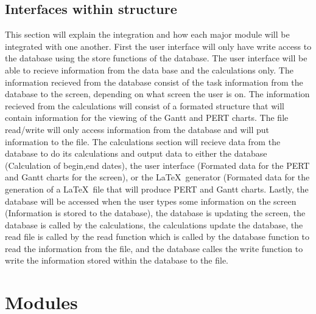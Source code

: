         \subsection{Interfaces within structure}
   This section will explain the integration and how each major module will
be integrated with one another. First the user interface will only have
write access to the database using the store functions of the database. The
user interface will be able to recieve information from the data base and
the calculations only. The information recieved from the database consist of
the task information from the database to the screen, depending on what screen
the user is on. The information recieved from the calculations will consist of
a formated structure that will contain information for the viewing of the Gantt
and PERT charts. The file read/write will only access information from the
database and will put information to the file. The calculations section will
recieve data from the database to do its calculations and output data to either
the database (Calculation of begin,end dates), the user interface (Formated data
for the PERT and Gantt charts for the screen), or the \LaTeX\ generator (Formated
data for the generation of a \LaTeX\ file that will produce PERT and Gantt charts.
Lastly, the database will be accessed when the user types some
information on the screen (Information is stored to the database), the database
is updating the screen, the database is called by the calculations, the
calculations update the database, the read file is called by the read function
which is called by the database function to read the information from the file,
and the database calles the write function to write the information stored
within the database to the file.

%
%
\section{Modules}

